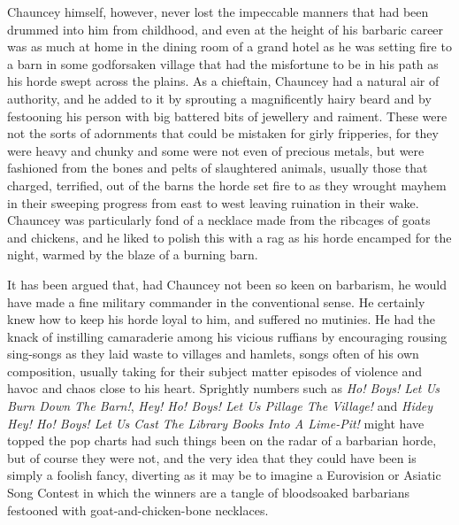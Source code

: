 Chauncey himself, however, never lost the impeccable manners that had been drummed into him from childhood, and even at the height of his barbaric career was as much at home in the dining room of a grand hotel as he was setting fire to a barn in some godforsaken village that had the misfortune to be in his path as his horde swept across the plains. As a chieftain, Chauncey had a natural air of authority, and he added to it by sprouting a magnificently hairy beard and by festooning his person with big battered bits of jewellery and raiment. These were not the sorts of adornments that could be mistaken for girly fripperies, for they were heavy and chunky and some were not even of precious metals, but were fashioned from the bones and pelts of slaughtered animals, usually those that charged, terrified, out of the barns the horde set fire to as they wrought mayhem in their sweeping progress from east to west leaving ruination in their wake. Chauncey was particularly fond of a necklace made from the ribcages of goats and chickens, and he liked to polish this with a rag as his horde encamped for the night, warmed by the blaze of a burning barn.

It has been argued that, had Chauncey not been so keen on barbarism, he would have made a fine military commander in the conventional sense. He certainly knew how to keep his horde loyal to him, and suffered no mutinies. He had the knack of instilling camaraderie among his vicious ruffians by encouraging rousing sing-songs as they laid waste to villages and hamlets, songs often of his own composition, usually taking for their subject matter episodes of violence and havoc and chaos close to his heart. Sprightly numbers such as \emph{Ho! Boys! Let Us Burn Down The Barn!}, \emph{Hey! Ho! Boys! Let Us Pillage The Village!} and \emph{Hidey Hey! Ho! Boys! Let Us Cast The Library Books Into A Lime-Pit!} might have topped the pop charts had such things been on the radar of a barbarian horde, but of course they were not, and the very idea that they could have been is simply a foolish fancy, diverting as it may be to imagine a Eurovision or Asiatic Song Contest in which the winners are a tangle of bloodsoaked barbarians festooned with goat-and-chicken-bone necklaces.

